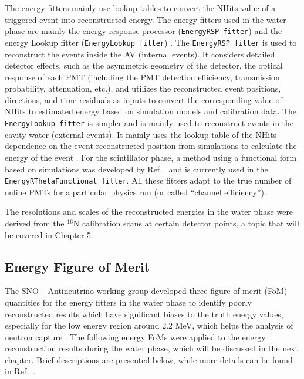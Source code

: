 The energy fitters mainly use lookup tables to convert the NHits value of a triggered event into reconstructed energy. The energy fitters used in the water phase are mainly the energy response processor (\texttt{EnergyRSP fitter}) \cite{walker2016study,boulay2004direct,moffat2001optical} and the energy Lookup fitter (\texttt{EnergyLookup fitter}) \cite{jones2011background,energyFunctional}. The \texttt{EnergyRSP fitter} is used to reconstruct the events inside the AV (internal events). It considers detailed detector effects, such as the asymmetric geometry of the detector, the optical response of each PMT (including the PMT detection efficiency, transmission probability, attenuation, etc.), and utilizes the reconstructed event positions, directions, and time residuals as inputs to convert the corresponding value of NHits to estimated energy based on simulation models and calibration data. The \texttt{EnergyLookup fitter} is simpler and is mainly used to reconstruct events in the cavity water (external events). It mainly uses the lookup table of the NHits dependence on the event reconstructed position from simulations to calculate the energy of the event \cite{jones2011background}. For the scintillator phase, a method using a functional form based on simulations was developed by Ref.~\cite{energyFunctional,energyRThetaFunctional} and is currently used in the \texttt{EnergyRThetaFunctional fitter}. All these fitters adapt to the true number of online PMTs for a particular physics run (or called ``channel efficiency''). 

The resolutions and scales of the reconstructed energies in the water phase were derived from the $^{16}$N calibration scans at certain detector points, a topic that will be covered in Chapter 5.

\subsection{Energy Figure of Merit}\label{sect:energy_fom}

The SNO+ Antineutrino working group developed three figure of merit (FoM) quantities for the energy fitters in the water phase to identify poorly reconstructed results which have significant biases to the truth energy values, especially for the low energy region around 2.2 MeV, which helps the analysis of neutron capture \cite{waterFoM,waterunidoc}. The following energy FoMs were applied to the energy reconstruction results during the water phase, which will be discussed in the next chapter. Brief descriptions are presented below, while more details can be found in Ref.~\cite{waterunidoc}.

